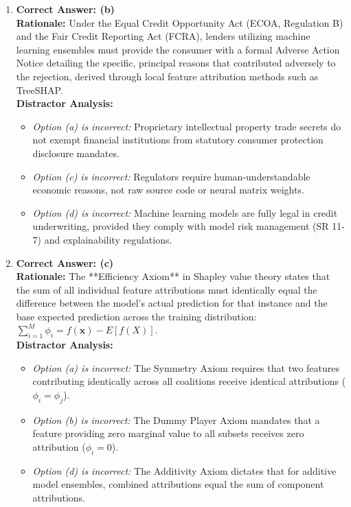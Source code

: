 \begin{enumerate}[label=\textbf{MCQ 12.\arabic*}]
    \item \textbf{Correct Answer: (b)}\\
    \textbf{Rationale:} Under the Equal Credit Opportunity Act (ECOA, Regulation B) and the Fair Credit Reporting Act (FCRA), lenders utilizing machine learning ensembles must provide the consumer with a formal Adverse Action Notice detailing the specific, principal reasons that contributed adversely to the rejection, derived through local feature attribution methods such as TreeSHAP.\\
    \textbf{Distractor Analysis:}
    \begin{itemize}
        \item \textit{Option (a) is incorrect:} Proprietary intellectual property trade secrets do not exempt financial institutions from statutory consumer protection disclosure mandates.
        \item \textit{Option (c) is incorrect:} Regulators require human-understandable economic reasons, not raw source code or neural matrix weights.
        \item \textit{Option (d) is incorrect:} Machine learning models are fully legal in credit underwriting, provided they comply with model risk management (SR 11-7) and explainability regulations.
    \end{itemize}

    \item \textbf{Correct Answer: (c)}\\
    \textbf{Rationale:} The **Efficiency Axiom** in Shapley value theory states that the sum of all individual feature attributions must identically equal the difference between the model's actual prediction for that instance and the base expected prediction across the training distribution: $\sum_{i=1}^M \phi_i = f(\mathbf{x}) - E[f(X)]$.\\
    \textbf{Distractor Analysis:}
    \begin{itemize}
        \item \textit{Option (a) is incorrect:} The Symmetry Axiom requires that two features contributing identically across all coalitions receive identical attributions ($\phi_i = \phi_j$).
        \item \textit{Option (b) is incorrect:} The Dummy Player Axiom mandates that a feature providing zero marginal value to all subsets receives zero attribution ($\phi_i = 0$).
        \item \textit{Option (d) is incorrect:} The Additivity Axiom dictates that for additive model ensembles, combined attributions equal the sum of component attributions.
    \end{itemize}
\end{enumerate}
